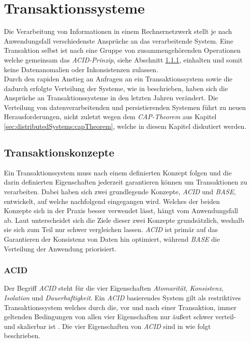 \chapter{Transaktionssysteme} \label{cha:transactionSystems}
Die Verarbeitung von Informationen in einem Rechnernetzwerk stellt je nach Anwendungsfall verschiedenste Ansprüche an das verarbeitende System. Eine Transaktion selbst ist nach \cite{rahm1993HochleistungsTransaktionssysteme} eine Gruppe von zusammengehörenden Operationen welche gemeinsam das \textit{ACID-Prinzip}, siehe Abschnitt \ref{sec:transactionTheory:acid}, einhalten und somit keine Datenanomalien oder Inkonsistenzen zulassen. \\
Durch den rapiden Anstieg an Anfragen an ein Transaktionssystem sowie die dadurch erfolgte Verteilung der Systeme, wie in \cite{li2017research} beschrieben, haben sich die Ansprüche an Transaktionssysteme in den letzten Jahren verändert. Die Verteilung von datenverarbeitenden und persistierenden Systemen führt zu neuen Herausforderungen, nicht zuletzt wegen dem \textit{CAP-Theorem} aus Kapitel \ref{sec:distributedSystems:capTheorem}, welche in diesem Kapitel diskutiert werden. 

\section{Transaktionskonzepte}
Ein Transaktionssystem muss nach \cite{rahm1993HochleistungsTransaktionssysteme} einem definierten Konzept folgen und die darin definierten Eigenschaften jederzeit garantieren können um Transaktionen zu verarbeiten. Dabei haben sich zwei grundlegende Konzepte, \textit{ACID} und \textit{BASE}, entwickelt, auf welche nachfolgend eingegangen wird. Welches der beiden Konzepte sich in der Praxis besser verwendet lässt, hängt vom Anwendungsfall ab. Laut \cite{EdlichFriedlandHampeBrauer201010} unterscheidet sich die Ziele dieser zwei Konzepte grundsätzlich, weshalb sie sich zum Teil nur schwer vergleichen lassen. \textit{ACID} ist primär auf das Garantieren der Konsistenz von Daten hin optimiert, während \textit{BASE} die Verteilung der Anwendung priorisiert.

\subsection{ACID}\label{sec:transactionTheory:acid}
Der Begriff \textit{ACID} steht für die vier Eigenschaften \textit{Atomarität}, \textit{Konsistenz}, \textit{Isolation} und \textit{Dauerhaftigkeit}. Ein \textit{ACID} basierendes System gilt als restriktives Transaktionssystem welches durch die, vor und nach einer Transaktion, immer geltenden Bedingungen von allen vier Eigenschaften nur äußert schwer verteil- und skalierbar ist \citep{PritchettBASE}.
Die vier Eigenschaften von \textit{ACID} sind in \cite{haerder198Acid} wie folgt beschrieben.

